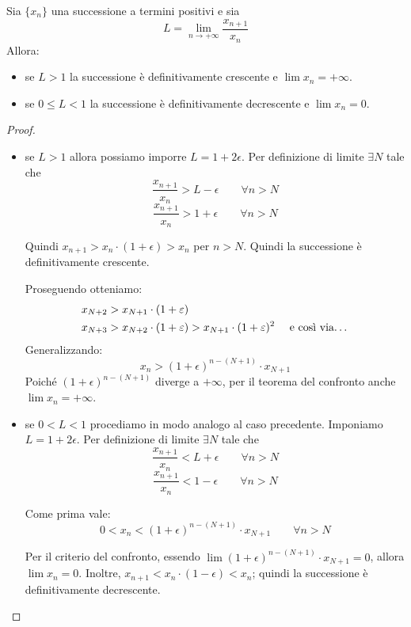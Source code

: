 \begin{theorem}
Sia $\{x_n\}$ una successione a termini positivi e sia 
\begin{equation*}
L = \lim_{n \to +\infty} \frac{x_{n+1}}{x_n}
\end{equation*}
Allora:
\begin{itemize}
\item se $L > 1$ la successione è definitivamente crescente e $\lim x_n = +\infty$.
\item se $0 \le L < 1$ la successione è definitivamente decrescente e $\lim x_n = 0$.
\end{itemize}
\end{theorem}

\begin{proof} \hfill
\begin{itemize}
\item se $L > 1$ allora possiamo imporre $L = 1 + 2\epsilon$. Per definizione di limite $\exists N$ tale che 
\begin{equation*}
\frac{x_{n+1}}{x_n} > L - \epsilon \qquad \forall n > N
\end{equation*}
\begin{equation*}
\frac{x_{n+1}}{x_n} > 1 + \epsilon \qquad \forall n > N
\end{equation*}

Quindi $x_{n+1} > x_n \cdot (1+\epsilon) > x_n$ per $n > N$. Quindi la successione è definitivamente crescente.

Proseguendo otteniamo:
\begin{align*}
x_{N+2} &> x_{N+1} \cdot (1+\epsilon) \\
x_{N+3} &> x_{N+2} \cdot (1+\epsilon) > x_{N+1} \cdot (1+\epsilon)^2 \quad \text { e così via\dots}
\end{align*}
Generalizzando:
\begin{equation*}
x_n > (1+\epsilon)^{n-(N+1)} \cdot x_{N+1}
\end{equation*}
Poiché $(1+\epsilon)^{n-(N+1)}$ diverge a $+\infty$, per il teorema del confronto anche $\lim x_n = +\infty$.

\item se $0 < L < 1$ procediamo in modo analogo al caso precedente. Imponiamo $L = 1 + 2\epsilon$. Per definizione di limite $\exists N$ tale che 
\begin{equation*}
\frac{x_{n+1}}{x_n} < L + \epsilon \qquad \forall n > N
\end{equation*}
\begin{equation*}
\frac{x_{n+1}}{x_n} < 1 - \epsilon \qquad \forall n > N
\end{equation*}

Come prima vale:
\begin{equation*}
0 < x_n < (1+\epsilon)^{n-(N+1)} \cdot x_{N+1} \qquad \forall n>N
\end{equation*}

Per il criterio del confronto, essendo $\lim (1+\epsilon)^{n-(N+1)} \cdot x_{N+1} = 0$, allora $\lim x_n = 0$. Inoltre, $x_{n+1} < x_n \cdot (1 - \epsilon) < x_n$; quindi la successione è definitivamente decrescente.
\end{itemize}
\end{proof}